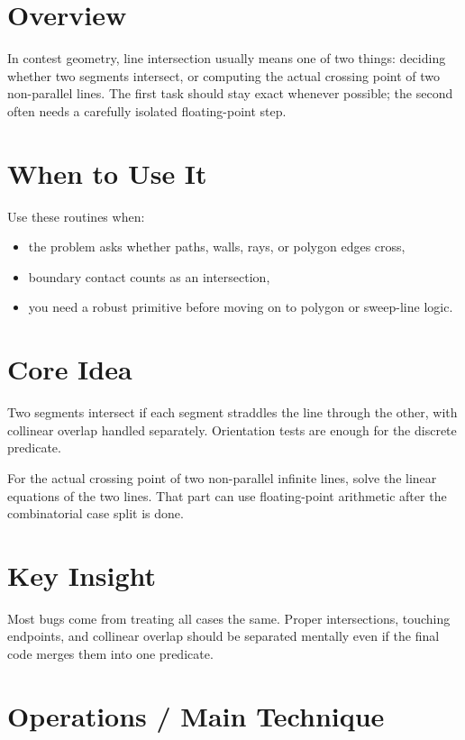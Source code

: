 \section*{Overview}

In contest geometry, line intersection usually means one of two things: deciding whether two segments intersect, or
computing the actual crossing point of two non-parallel lines. The first task should stay exact whenever possible; the
second often needs a carefully isolated floating-point step.

\section*{When to Use It}

Use these routines when:

\begin{itemize}
  \item the problem asks whether paths, walls, rays, or polygon edges cross,
  \item boundary contact counts as an intersection,
  \item you need a robust primitive before moving on to polygon or sweep-line logic.
\end{itemize}

\section*{Core Idea}

Two segments intersect if each segment straddles the line through the other, with collinear overlap handled
separately. Orientation tests are enough for the discrete predicate.

For the actual crossing point of two non-parallel infinite lines, solve the linear equations of the two lines. That
part can use floating-point arithmetic after the combinatorial case split is done.

\section*{Key Insight}

Most bugs come from treating all cases the same. Proper intersections, touching endpoints, and collinear overlap should
be separated mentally even if the final code merges them into one predicate.

\section*{Operations / Main Technique}

